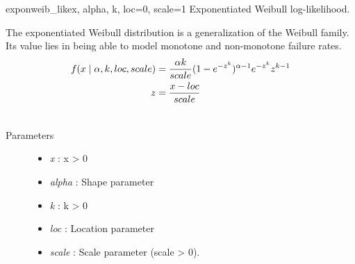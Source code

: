 \hypertarget{pymc.distributions.exponweib_like}{}\begin{funcdesc}{exponweib\_like}{x, alpha, k, loc=0, scale=1}
Exponentiated Weibull log-likelihood.

The exponentiated Weibull distribution is a generalization of the Weibull
family. Its value lies in being able to model monotone and non-monotone
failure rates.
\begin{gather}
\begin{split}f(x \mid \alpha,k,loc,scale)  & = \frac{\alpha k}{scale} (1-e^{-z^k})^{\alpha-1} e^{-z^k} z^{k-1} \\
z & = \frac{x-loc}{scale}\end{split}\notag\\\begin{split}\end{split}\notag
\end{gather}\begin{description}
\item[Parameters] \leavevmode\begin{itemize}
\item {} 
\emph{x} : x \textgreater{} 0

\item {} 
\emph{alpha} : Shape parameter

\item {} 
\emph{k} : k \textgreater{} 0

\item {} 
\emph{loc} : Location parameter

\item {} 
\emph{scale} : Scale parameter (scale \textgreater{} 0).

\end{itemize}

\end{description}
\end{funcdesc}

